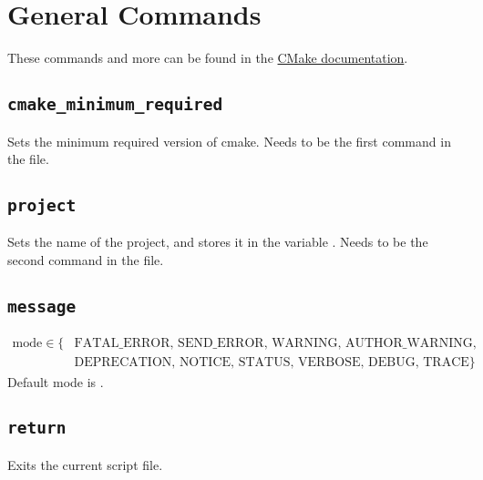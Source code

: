 \section{General Commands} \label{s:general_commands}
These commands and more can be found in the \href{https://cmake.org/cmake/help/latest/}{CMake documentation}. \\



\subsection{\texttt{cmake\_minimum\_required}}
\begin{center}  \end{center}
Sets the minimum required version of cmake. Needs to be the first command in the  file.



\subsection{\texttt{project}}
\begin{center}  \end{center}
Sets the name of the project, and stores it in the variable . Needs to be the second command in the  file.



\subsection{\texttt{message}}
\begin{center}  \end{center}
\begin{align*}
    \text{mode} \in \{ &\text{FATAL\_ERROR},\,\text{SEND\_ERROR},\,\text{WARNING},\,\text{AUTHOR\_WARNING},\, \\
    &\text{DEPRECATION},\,\text{NOTICE},\,\text{STATUS},\,\text{VERBOSE},\,\text{DEBUG},\,\text{TRACE} \}
\end{align*}
Default mode is .



\subsection{\texttt{return}}
\begin{center}  \end{center}
Exits the current script file.



